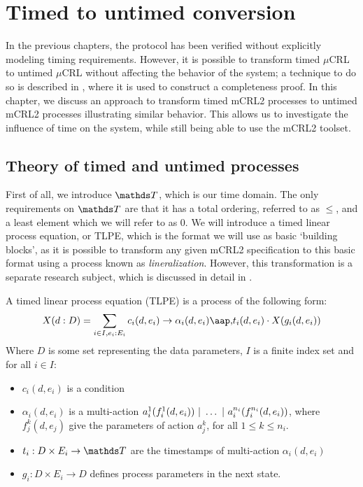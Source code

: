 \chapter{Timed to untimed conversion}

In the previous chapters, the protocol has been verified without explicitly modeling timing requirements. However, it is possible to transform timed $\mu$CRL to untimed $\mu$CRL without affecting the behavior of the system; a technique to do so is described in \cite{reniers02completenesstimed}, where it is used to construct a completeness proof.  In this chapter, we discuss an approach to transform timed mCRL2 processes to untimed mCRL2 processes illustrating similar behavior. This allows us to investigate the influence of time on the system, while still being able to use the mCRL2 toolset.

\section{Theory of timed and untimed processes}

First of all, we introduce $\TTT$, which is our time domain. The only requirements on $\TTT$ are that it has a total ordering, referred to as $\leq$, and a least element which we will refer to as $0$. We will introduce a timed linear process equation, or TLPE, which is the format we will use as basic `building blocks', as it is possible to transform any given mCRL2 specification to this basic format using a process known as \emph{lineralization}. However, this transformation is a separate research subject, which is discussed in detail in \cite{usenko02linearalizationmcrl}.
\\
\begin{definition} \label{def:lpe}
A timed linear process equation (TLPE) is a process of the following form:
\begin{displaymath}
X(d:D) = \sum_{i \in I, e_i: E_i} c_i(d,e_i) \rightarrow \alpha_i(d, e_i) \at t_i(d, e_i) \cdot X(g_i(d, e_i))
\end{displaymath}
Where $D$ is some set representing the data parameters, $I$ is a finite index set and for all $i \in I$:
\begin{itemize}
\item $c_i(d,e_i)$ is a condition
\item $\alpha_i(d, e_i)$ is a multi-action $a_i^1(f_i^1(d, e_i)) ~|~ \dots ~|~ a_i^{n_i}(f_i^{n_i}(d, e_i))$, where $f_j^k(d, e_j)$ give the parameters of action $a_j^k$, for all $1 \leq k \leq n_i$.
\item $t_i: D \times E_i \rightarrow \TTT$ are the timestamps of multi-action $\alpha_i(d, e_i)$
\item $g_i: D \times E_i \rightarrow D$ defines process parameters in the next state.
\end{itemize}
\end{definition}

